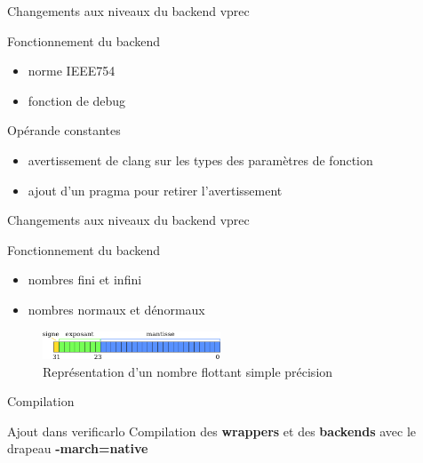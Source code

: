\documentclass{beamer}
\begin{document}
\begin{frame}{Changements aux niveaux du backend vprec}

  \begin{block}{Fonctionnement du backend}
    \begin{itemize}
    \item norme IEEE754
    \item fonction de debug
    \end{itemize}
  \end{block}

  \begin{block}{Opérande constantes}
    \begin{itemize}
    \item avertissement de clang sur les types des paramètres de fonction
    \item ajout d'un pragma pour retirer l'avertissement
    \end{itemize}
  \end{block}

\end{frame}

\begin{frame}{Changements aux niveaux du backend vprec}

  \begin{block}{Fonctionnement du backend}
    \begin{itemize}
    \item nombres fini et infini
    \item nombres normaux et dénormaux
    \end{itemize}
  \end{block}

  \begin{figure}
    \centering
    \includegraphics[width=200px]{../ressources/IEEE754_simple_precision.png}
    \caption{\label{fig:ieee_simple_precision}Représentation d'un nombre flottant simple précision}
  \end{figure}

\end{frame}

\begin{frame}{Compilation}

  \begin{block}{Ajout dans verificarlo}
    Compilation des \textbf{wrappers} et des \textbf{backends} avec le drapeau
    \textbf{-march=native}
  \end{block}

\end{frame}
\end{document}
